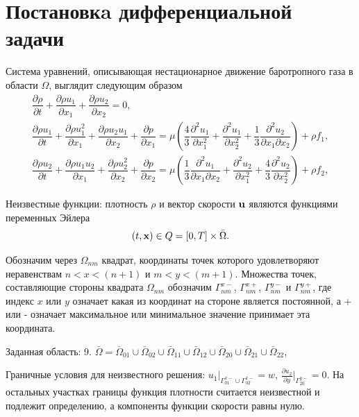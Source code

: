 \documentclass[a4paper,11pt]{article}
\begin{document}
\section{Постановкa дифференциальной задачи}
Система уравнений, описывающая нестационарное движение баротропного газа
в области $\Omega$,
выглядит следующим образом
\begin{equation}
\begin{array}{l}
\dfrac{\partial \rho}{\partial t}+\dfrac{\partial \rho u_1}{\partial x_1}+
\dfrac{\partial \rho u_2}{\partial x_2}= 0, \\[2.0ex]
\dfrac{\partial \rho u_1}{\partial t}
+\dfrac{\partial \rho u_1^2}{\partial x_1}+
\dfrac{\partial \rho u_2 u_1}{\partial x_2}+
\dfrac{\partial p}{\partial x_1}
=\mu\left(
\dfrac{4}{3}\dfrac{\partial^2 u_1}{\partial x_1^2}+
\dfrac{\partial^2 u_1}{\partial x_2^2}+
\dfrac{1}{3}\dfrac{\partial^2 u_2}{\partial x_1\partial x_2}\right)
+\rho f_1, \\[2.0ex]
\dfrac{\partial \rho u_2}{\partial t}
+\dfrac{\partial \rho u_1 u_2}{\partial x_1}+
\dfrac{\partial \rho u_2^2}{\partial x_2}+
\dfrac{\partial p}{\partial x_2}
=\mu\left(
\dfrac{1}{3}\dfrac{\partial^2 u_1}{\partial x_1\partial x_2}+
\dfrac{\partial^2 u_2}{\partial x_1^2}+
\dfrac{4}{3}\dfrac{\partial^2 u_2}{\partial x_2^2}\right)
+\rho f_2,
\end{array}
\label{dif.1}
\end{equation}

Неизвестные функции: плотность $\rho$  и вектор скорости ${\bf u}$ являются
функциями переменных Эйлера
$$
(t,{\bf x}) \in Q=[0,T]\times\bar\Omega.
$$%

Обозначим через $\Omega_{nm}$ квадрат, координаты точек которого удовлетворяют
неравенствам $n < x < (n+1)$ и $m < y < (m+1)$. Множества точек,
составляющие стороны квадрата $\Omega_{nm}$ обозначим $\Gamma_{nm}^{x-}$,
$\Gamma_{nm}^{x+}$, $\Gamma_{nm}^{y-}$ и $\Gamma_{nm}^{y+}$,
где индекс $x$ или $y$ означает какая из координат на стороне
является постоянной,
а + или - означает максимальное или минимальное значение
принимает эта координата.

Заданная область: 9. $\bar\Omega=\bar\Omega_{01}\cup\bar\Omega_{02}\cup\bar\Omega_{11}\cup
\bar\Omega_{12}\cup\bar\Omega_{20}\cup\bar\Omega_{21}\cup\bar\Omega_{22}$,

Граничные условия для неизвестного решения: $u_1\vert_{\Gamma_{01}^{x-}\cup\Gamma_{02}^{x-}}=w$,
$\frac{\partial u_2}{\partial y}\vert_{\Gamma_{20}^{y-}}=0$.
На остальных участках границы
функция плотности считается неизвестной и подлежит определению, а компоненты функции скорости равны нулю.
\end{document}

